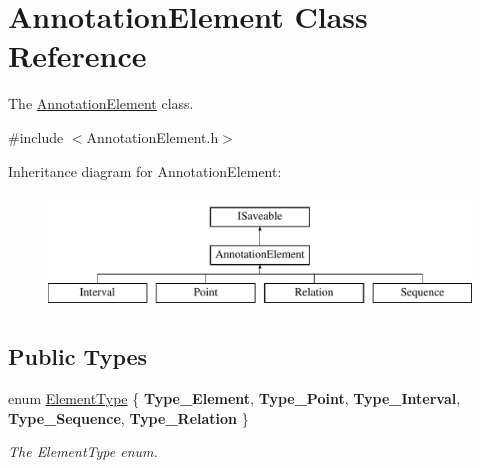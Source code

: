 \hypertarget{class_annotation_element}{}\section{Annotation\+Element Class Reference}
\label{class_annotation_element}


The \hyperlink{class_annotation_element}{Annotation\+Element} class.  




{\ttfamily \#include $<$Annotation\+Element.\+h$>$}

Inheritance diagram for Annotation\+Element\+:\begin{figure}[H]
\begin{center}
\leavevmode
\includegraphics[height=3.000000cm]{class_annotation_element}
\end{center}
\end{figure}
\subsection*{Public Types}
\begin{DoxyCompactItemize}
\item 
\mbox{\label{class_annotation_element_af5282990ffbe25eeea8ab02037e344b0}} 
enum \hyperlink{class_annotation_element_af5282990ffbe25eeea8ab02037e344b0}{Element\+Type} \{ \newline
{\bfseries Type\+\_\+\+Element}, 
{\bfseries Type\+\_\+\+Point}, 
{\bfseries Type\+\_\+\+Interval}, 
{\bfseries Type\+\_\+\+Sequence}, 
\newline
{\bfseries Type\+\_\+\+Relation}
 \}\begin{DoxyCompactList}\small\item\em The Element\+Type enum. \end{DoxyCompactList}
\end{DoxyCompactItemize}
